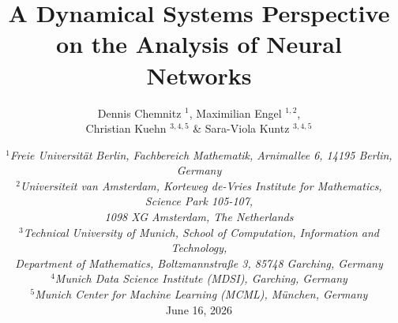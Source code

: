 \documentclass[10pt]{article}
\begin{document}
\title{\textbf{A Dynamical Systems Perspective \\ on the Analysis of Neural Networks}}
\vspace{2mm}
\author{Dennis Chemnitz $^1$, Maximilian Engel $^{1,2}$, \\[1mm] Christian Kuehn $^{3,4,5}$ \& Sara-Viola Kuntz $^{3,4,5}$}

\date{
	\small{$^1$\textit{Freie Universität Berlin, Fachbereich Mathematik, Arnimallee 6, 14195 Berlin, Germany} \\
	$^2$\textit{Universiteit van Amsterdam, Korteweg de-Vries Institute for Mathematics, Science Park 105-107, \\ 1098 XG Amsterdam, The Netherlands} \\
	$^3$\textit{Technical University of Munich, School of Computation, Information and Technology, \\ Department of Mathematics, Boltzmannstraße 3, 85748 Garching, Germany} \\
	$^4$\textit{Munich Data Science Institute (MDSI), Garching, Germany } \\
	$^5$\textit{Munich Center for Machine Learning (MCML), München, Germany }}\\[7mm]
	\large{June 16, 2026}
}

\vspace{2mm}

\maketitle
\end{document}
